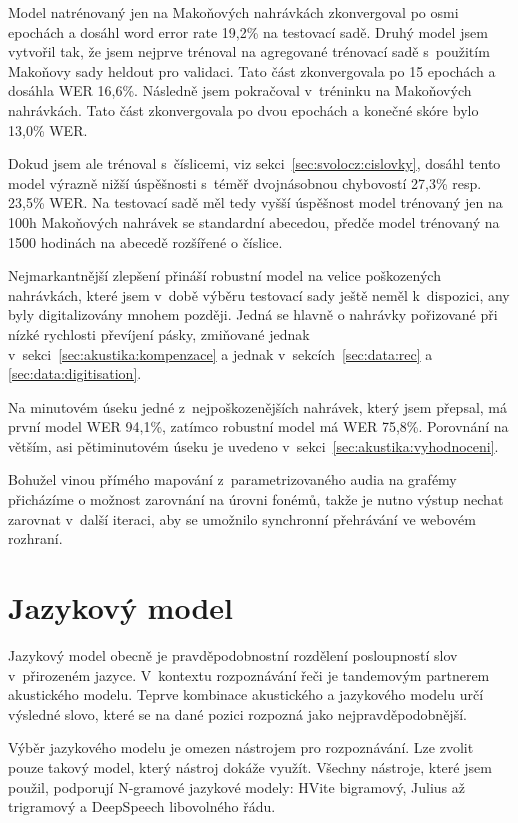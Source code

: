 Model natrénovaný jen na Makoňových nahrávkách zkonvergoval po osmi epochách a
dosáhl word error rate 19,2\% na testovací sadě. Druhý model jsem vytvořil tak,
že jsem nejprve trénoval na agregované trénovací sadě s~použitím Makoňovy
sady heldout pro validaci. Tato část zkonvergovala po 15 epochách a dosáhla WER
16,6\%. Následně jsem pokračoval v~tréninku na Makoňových nahrávkách. Tato část
zkonvergovala po dvou epochách a konečné skóre bylo 13,0\% WER.

Dokud jsem ale trénoval s~číslicemi, viz sekci~\ref{sec:svolocz:cislovky},
dosáhl tento model výrazně nižší úspěšnosti s~téměř dvojnásobnou chybovostí
27,3\% resp. 23,5\% WER.
Na testovací sadě měl tedy vyšší úspěšnost model trénovaný jen na 100h Makoňových
nahrávek se standardní abecedou, předče model trénovaný na 1500 hodinách na
abecedě rozšířené o číslice.


Nejmarkantnější zlepšení přináší robustní model na velice poškozených nahrávkách, které jsem
v~době výběru testovací sady ještě neměl k~dispozici, any byly digitalizovány
mnohem později. Jedná se hlavně o nahrávky pořizované při nízké rychlosti
převíjení pásky, zmiňované jednak v~sekci~\ref{sec:akustika:kompenzace} a jednak
v~sekcích~\ref{sec:data:rec} a \ref{sec:data:digitisation}.

Na minutovém úseku jedné z~nejpoškozenějších nahrávek, který jsem
přepsal, má první model WER 94,1\%, zatímco robustní model má WER
75,8\%. Porovnání na větším, asi pětiminutovém úseku je uvedeno
v~sekci~\ref{sec:akustika:vyhodnoceni}.

Bohužel vinou přímého mapování z~parametrizovaného audia na grafémy přicházíme o
možnost zarovnání na úrovni fonémů, takže je nutno výstup nechat zarovnat
v~další iteraci, aby se umožnilo synchronní přehrávání ve webovém rozhraní.

\section{Jazykový model}
\label{sec:jazykovy-model}

Jazykový model obecně je pravděpodobnostní rozdělení posloupností slov
v~přirozeném jazyce\cite{ponte1998language}. V~kontextu rozpoznávání řeči je tandemovým
partnerem akustického modelu\cite{jelinek1990self}. Teprve kombinace akustického
a jazykového modelu určí výsledné slovo, které se na dané pozici rozpozná jako
nejpravděpodobnější.

Výběr jazykového modelu je omezen nástrojem pro rozpoznávání. Lze zvolit pouze
takový model, který nástroj dokáže využít. Všechny nástroje, které jsem použil,
podporují N-gramové jazykové modely: HVite bigramový, Julius až trigramový a
DeepSpeech libovolného řádu.


